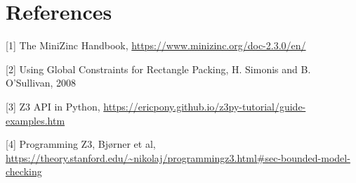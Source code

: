 \section{References}

[1] The MiniZinc Handbook, \url{https://www.minizinc.org/doc-2.3.0/en/}

[2] Using Global Constraints for Rectangle Packing, H. Simonis and B. O’Sullivan, 2008

[3] Z3 API in Python, \url{https://ericpony.github.io/z3py-tutorial/guide-examples.htm}

[4] Programming Z3, Bjørner et al, \\ \url{https://theory.stanford.edu/~nikolaj/programmingz3.html#sec-bounded-model-checking}